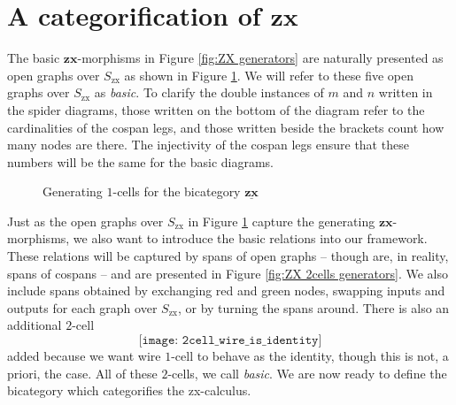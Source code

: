 \documentclass[a4paper,UKenglish]{lipics-v2016}
\begin{document}
\section{A categorification of $\mathbf{zx}$}
\label{sec:zx categorified}

The basic $\mathbf{zx}$-morphisms in Figure \ref{fig:ZX generators} are naturally presented as open graphs over $S_{\text{zx}}$ as shown in Figure \ref{fig:ZX 1cells generators}.  We will refer to these five open graphs over $S_{\text{zx}}$ as \emph{basic}.  To clarify the double instances of $m$ and $n$ written in the spider diagrams, those written on the bottom of the diagram refer to the cardinalities of the cospan legs, and those written beside the brackets count how many nodes are there.  The injectivity of the cospan legs ensure that these numbers will be the same for the basic diagrams.

\begin{figure}[h]
	\caption{Generating $1$-cells for the bicategory $\underline{\mathbf{zx}}$}
	\label{fig:ZX 1cells generators}
\end{figure} 

Just as the open graphs over $S_{\text{zx}}$ in Figure \ref{fig:ZX 1cells generators} capture the generating $\mathbf{zx}$-morphisms, we also want to introduce the basic relations into our framework.  These relations will be captured by spans of open graphs -- though are, in reality, spans of cospans -- and are presented in Figure \ref{fig:ZX 2cells generators}. We also include spans obtained by exchanging red and green nodes, swapping inputs and outputs for each graph over $S_{\text{zx}}$, or by turning the spans around.  There is also an additional $2$-cell
\begin{equation}
\label{eq:2cell wire is identity}
	\texttt{[image: 2cell\_wire\_is\_identity]}
\end{equation}
added because we want wire $1$-cell to behave as the identity, though this is not, a priori, the case. All of these $2$-cells, we call \emph{basic}.  We are now ready to define the bicategory which categorifies the zx-calculus.
\end{document}

